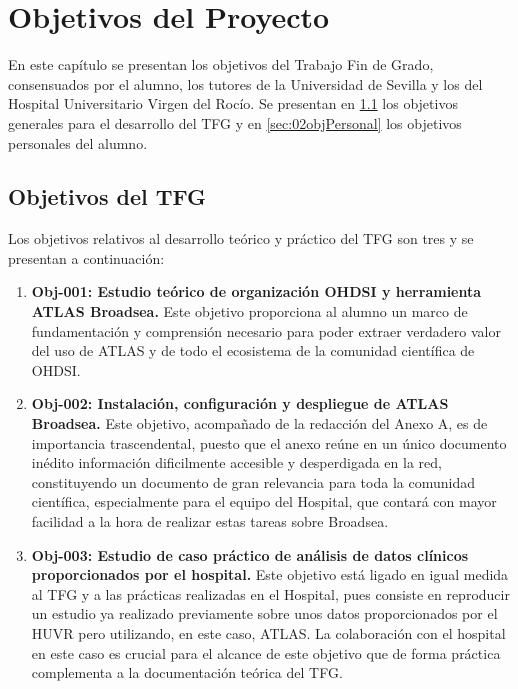 \chapter{Objetivos del Proyecto}\label{cap:02objetivos}

En este capítulo se presentan los objetivos del Trabajo Fin de Grado, consensuados por el alumno, los tutores de la Universidad de Sevilla y los del Hospital Universitario Virgen del Rocío. Se presentan en \ref{sec:02objTFG} los objetivos generales para el desarrollo del TFG y en \ref{sec:02objPersonal} los objetivos personales del alumno.

\section{Objetivos del TFG} \label{sec:02objTFG}

Los objetivos relativos al desarrollo teórico y práctico del TFG son tres y se presentan a continuación:

%

\begin{enumerate}

    \item \textbf{Obj-001: Estudio teórico de organización OHDSI y herramienta ATLAS Broadsea.} Este objetivo proporciona al alumno un marco de fundamentación y comprensión necesario para poder extraer verdadero valor del uso de ATLAS y de todo el ecosistema de la comunidad científica de OHDSI.

    \item \textbf{Obj-002: Instalación, configuración y despliegue de ATLAS Broadsea.} Este objetivo, acompañado de la redacción del Anexo A, es de importancia trascendental, puesto que el anexo reúne en un único documento inédito información dificilmente accesible y desperdigada en la red, constituyendo un documento de gran relevancia para toda la comunidad científica, especialmente para el equipo del Hospital, que contará con mayor facilidad a la hora de realizar estas tareas sobre Broadsea.

    \item \textbf{Obj-003: Estudio de caso práctico de análisis de datos clínicos proporcionados por el hospital.} Este objetivo está ligado en igual medida al TFG y a las prácticas realizadas en el Hospital, pues consiste en reproducir un estudio ya realizado previamente sobre unos datos proporcionados por el HUVR pero utilizando, en este caso, ATLAS. La colaboración con el hospital en este caso es crucial para el alcance de este objetivo que de forma práctica complementa a la documentación teórica del TFG.

\end{enumerate}

